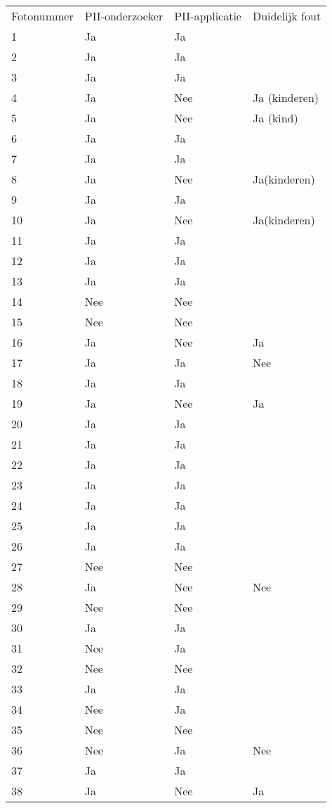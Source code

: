 \begin{tabularx}{\linewidth}{ |l|l|l|X| } 
	\hline
	Fotonummer & PII-onderzoeker & PII-applicatie & Duidelijk fout  \\ [0.5ex]
	
	1 & Ja & Ja & \\
	2 & Ja & Ja & \\
	3 & Ja & Ja & \\
	4& Ja & Nee & Ja (kinderen) \\
	5& Ja & Nee & Ja (kind)\\
	6 & Ja & Ja & \\
	7 & Ja & Ja & \\
	8 & Ja & Nee & Ja(kinderen) \\
	9 & Ja & Ja & \\
	10 & Ja & Nee & Ja(kinderen) \\
	11 & Ja & Ja & \\
	12 & Ja & Ja & \\
	13 & Ja & Ja & \\
	14 & Nee & Nee & \\
	15 & Nee & Nee & \\
	16 & Ja & Nee & Ja \\
	17 & Ja & Ja & Nee  \\
	18 & Ja & Ja & \\
	19 & Ja & Nee & Ja \\
	20 & Ja & Ja & \\
	21 & Ja & Ja & \\
	22 & Ja & Ja & \\
	23 & Ja & Ja & \\
	24 & Ja & Ja & \\
	25 & Ja & Ja & \\
	26 & Ja & Ja & \\
	27 & Nee & Nee & \\
	28 & Ja & Nee & Nee\\
	29 & Nee & Nee & \\
	30 & Ja & Ja & \\
	31 & Nee & Ja & \\
	32 & Nee & Nee & \\
	33 & Ja & Ja & \\
	34 & Nee & Ja & \\
	35 & Nee & Nee & \\
	36 & Nee & Ja & Nee\\
	37 & Ja & Ja & \\
	38 & Ja & Nee & Ja \\
	\hline
	
\end{tabularx}

